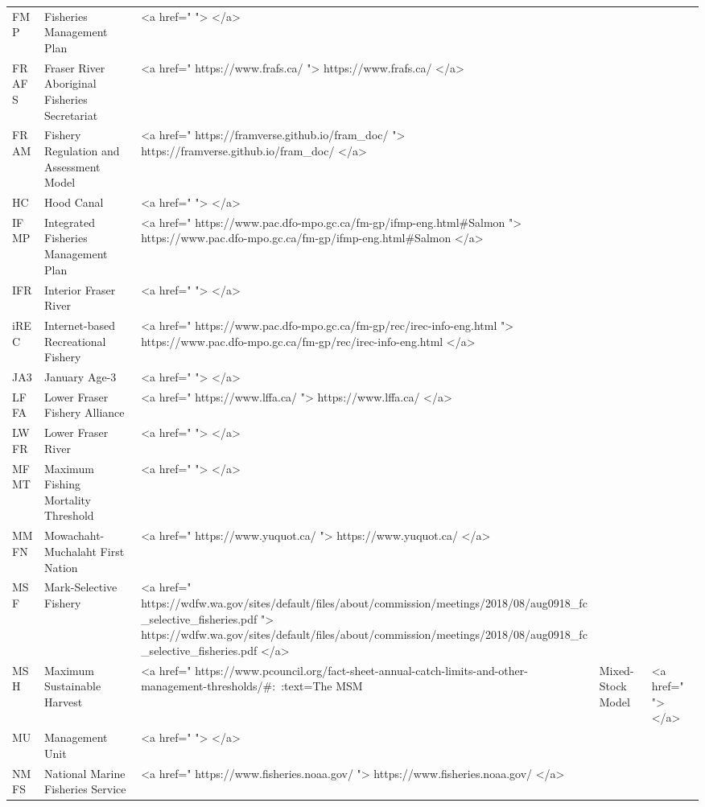 \documentclass[
  letterpaper,
  DIV=11,
  numbers=noendperiod]{scrartcl}
\begin{document}
\begin{table}
\begin{tabular*}{\linewidth}{@{\extracolsep{\fill}}lll}
FMP & Fisheries Management Plan & <a href="  ">  </a> \\ 
FRAFS & Fraser River Aboriginal Fisheries Secretariat & <a href=" https://www.frafs.ca/ "> https://www.frafs.ca/ </a> \\ 
FRAM & Fishery Regulation and Assessment Model & <a href=" https://framverse.github.io/fram_doc/ "> https://framverse.github.io/fram_doc/ </a> \\ 
HC & Hood Canal & <a href="  ">  </a> \\ 
IFMP & Integrated Fisheries Management Plan & <a href=" https://www.pac.dfo-mpo.gc.ca/fm-gp/ifmp-eng.html#Salmon "> https://www.pac.dfo-mpo.gc.ca/fm-gp/ifmp-eng.html#Salmon </a> \\ 
IFR & Interior Fraser River & <a href="  ">  </a> \\ 
iREC & Internet-based Recreational Fishery & <a href=" https://www.pac.dfo-mpo.gc.ca/fm-gp/rec/irec-info-eng.html "> https://www.pac.dfo-mpo.gc.ca/fm-gp/rec/irec-info-eng.html </a> \\ 
JA3 & January Age-3 & <a href="  ">  </a> \\ 
LFFA & Lower Fraser Fishery Alliance & <a href=" https://www.lffa.ca/ "> https://www.lffa.ca/ </a> \\ 
LWFR & Lower Fraser River & <a href="  ">  </a> \\ 
MFMT & Maximum Fishing Mortality Threshold & <a href="  ">  </a> \\ 
MMFN & Mowachaht-Muchalaht First Nation & <a href=" https://www.yuquot.ca/ "> https://www.yuquot.ca/ </a> \\ 
MSF & Mark-Selective Fishery & <a href=" https://wdfw.wa.gov/sites/default/files/about/commission/meetings/2018/08/aug0918_fc_selective_fisheries.pdf "> https://wdfw.wa.gov/sites/default/files/about/commission/meetings/2018/08/aug0918_fc_selective_fisheries.pdf </a> \\ 
MSH & Maximum Sustainable Harvest & <a href=" https://www.pcouncil.org/fact-sheet-annual-catch-limits-and-other-management-thresholds/#:~:text=The%
MSM & Mixed-Stock Model & <a href="  ">  </a> \\ 
MU & Management Unit & <a href="  ">  </a> \\ 
NMFS & National Marine Fisheries Service & <a href=" https://www.fisheries.noaa.gov/ "> https://www.fisheries.noaa.gov/ </a> \\ 

\end{tabular*}
\end{table}
\end{document}
